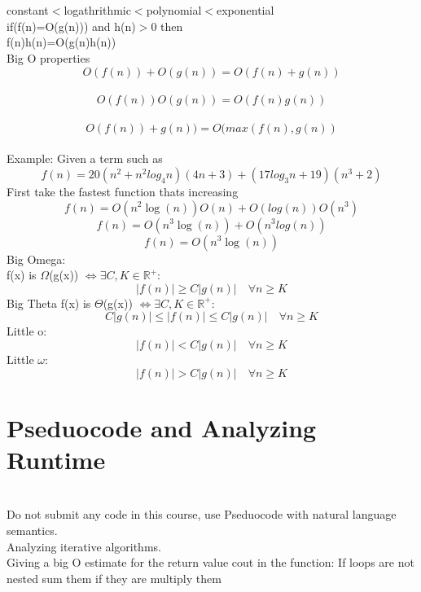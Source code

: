 \documentclass[12pt]{article}
\newcommand{\sect}[1]{\section*{#1}}
\newcommand{\R}{\mathbb{R}}
\theoremstyle{definition}
\theoremstyle{remark}
\numberwithin{equation}{section}
\begin{document}
\\\\
constant$<$logathrithmic$<$polynomial$<$exponential\\
if(f(n)=O(g(n))) and h(n)$>$0 then\\ f(n)h(n)=O(g(n)h(n))\\
 Big O properties\\
$$O(f(n))+O(g(n))=O(f(n)+g(n))$$\\
$$O(f(n))O(g(n))=O(f(n)g(n))$$\\
$$O(f(n))+g(n))=O(max(f(n),g(n))$$\\
\prop Example:
Given a term such as
\[
  f(n)=20(n^2+n^2log_4n)(4n+3)+(17log_3n+19)(n^3+2)
\]
First take the fastest  function thats increasing
\[
  f(n)=O(n^2\log(n))O(n)+O(log(n))O(n^3)
\]
\[
  f(n)=O(n^3\log(n))+O(n^3log(n))
\]
\[
  f(n)=O(n^3\log(n))
\]
 Big Omega: \\
f(x) is $\Omega$(g(x)) $\iff$$\exists C,K\in \R^+:$
\[
  |f(n)|\geq C|g(n)|\quad \forall n\geq K
\]
 Big Theta
f(x) is $\Theta$(g(x)) $\iff$$\exists C,K\in \R^+:$
\[
C|g(n)|\leq  |f(n)|\leq C|g(n)|\quad \forall n\geq K
\]
 Little o:
\[
  |f(n)| < C|g(n)|\quad \forall n\geq K
\]
 Little $\omega$:
\[
  |f(n)| > C|g(n)|\quad \forall n\geq K
\]
\sect{Pseduocode and Analyzing Runtime}\\
Do not submit any code in this course, use Pseduocode with natural language semantics. \\
 Analyzing iterative algorithms. \\
Giving a big O estimate for the return value cout in the function: If loops are not nested sum them if they are multiply them
\end{document}
